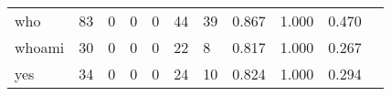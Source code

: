\begin{longtable}{lp{1.20cm}p{1.20cm}p{1.20cm}p{1.20cm}p{1.20cm}p{1.20cm}p{1.20cm}p{1.20cm}p{1.20cm}p{1.20cm}}
who       &                                    83 &                                                  0 &                                                  0 &                                                  0 &                                                 44 &                                                 39 &                                         0.867 &                                              1.000 &                                              0.470 \\
whoami    &                                    30 &                                                  0 &                                                  0 &                                                  0 &                                                 22 &                                                  8 &                                         0.817 &                                              1.000 &                                              0.267 \\
yes       &                                    34 &                                                  0 &                                                  0 &                                                  0 &                                                 24 &                                                 10 &                                         0.824 &                                              1.000 &                                              0.294 \\
\end{longtable}
